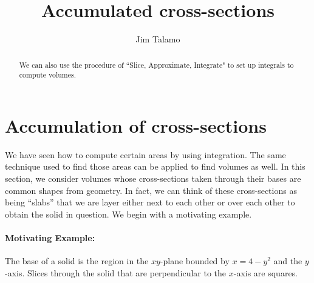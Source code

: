 \documentclass{ximera}
\author{Jim Talamo}
\title[Dig-In:]{Accumulated cross-sections}
\begin{document}
\begin{abstract}
  We can also use the procedure of ``Slice, Approximate, Integrate" to set up integrals to compute volumes.
\end{abstract}
\maketitle

\section{Accumulation of cross-sections}

We have seen how to compute certain areas by using integration. The same technique used to find those areas can be applied to find volumes as well. In this section, we consider volumes whose cross-sections taken through their bases are common shapes from geometry.  In fact, we can think of these cross-sections as being ``slabs'' that we are layer either next to each other or over each other to obtain the solid in question.  We begin with a motivating example.



\paragraph{Motivating Example:} The base of a solid is the region in the $xy$-plane bounded by $x=4-y^2$ and the $y$-axis.  Slices through the solid that are perpendicular to the $x$-axis are squares.  
\end{document}
